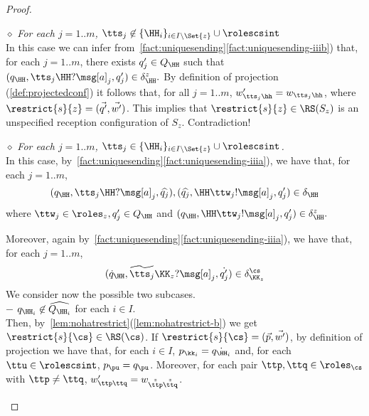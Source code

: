 \begin{proof}
\begin{description}
\begin{description}
\begin{description}
\item
\underline{$\diamond$}
{\it For each  $j=1..m$, $\tts_j \not\in \{\HH_i\}_{i \in I\setminus\Set{z}}\cup\rolescsint$}\\ %
In this case we can infer from~\cref{fact:uniquesending}\ref{fact:uniquesending-iiib}) that, for each $j=1..m$, there exists $q'_j \in Q_{\HH}$
such that $(q_\HH,\tts_j\HH?\msg[a]_j,q'_j)\in\delta^z_\HH.$
 By definition of projection (\cref{def:projectedconf}) it follows that, for all $j=1..m$,
$w'_{\tts_j\hh}=w_{\tts_j\hh}$, where 
$\restrict{s}{z}=(\vec{q'},\vec{w'})$. 
 This implies that $\restrict{s}{z}\in \RS(S_z)$ is an  unspecified reception configuration of $S_z$. Contradiction!\\
%
\item
\underline{$\diamond$} {\it  For each  $j=1..m$,
 $\tts_j\in \{\HH_i\}_{i \in I\setminus\Set{z}}\cup\rolescsint$.  
} \\
In this case, by~\cref{fact:uniquesending}\ref{fact:uniquesending-iiia}), we have that, for each $j=1..m$, 
$$(q_\HH,\tts_j\HH?\msg[a]_j,\widehat{q_j}), (\widehat{q_j},\HH\ttw_j!\msg[a]_j,q'_j)\in\delta_\HH $$
where $\ttw_j \in \roles_z, q'_j \in Q_\HH$ and 
$(q_{\HH},\HH\ttw_j!\msg[a]_j,q'_j)\in\delta^z_\HH.$

Moreover, again by~\cref{fact:uniquesending}\ref{fact:uniquesending-iiia}), %
we have that, for each $j=1..m$,
$$(\dot{q}_\HH,\widetilde{\tts_j}\KK_z?\msg[a]_j,\dot{q'_j})\in\delta^\cs_{\KK_z} $$
We consider now the possible two subcases.\\
$-$ ${q}_{\HH_i}\not\in\widehat{Q_{\HH_i}}$ for each $i\in I$.\\
Then, by~\cref{lem:nohatrestrict}(\ref{lem:nohatrestrict-b}) we get $\restrict{s}{\cs}\in \RS(\cs)$. 
If $\restrict{s}{\cs} = (\vec{p},\vec{w'})$, by definition of projection we have that,
 for each $i \in   I$, $p_{\kk_i} = \dot{q_{\HH_i}}$  and,
 for each $\ttu \in   \rolescsint$, $p_{\pu} = q_{\pu}$. Moreover,
  for each pair $\ttp,\ttq\in \roles_{\cs}$ with $\ttp\neq\ttq$, 
 $w'_{\ttp\ttq} = w_{\tilde{\tilde{\ttp}}\tilde{\tilde{\ttq}}}$.


\end{description}
\end{description}
\end{description}
\end{proof}
